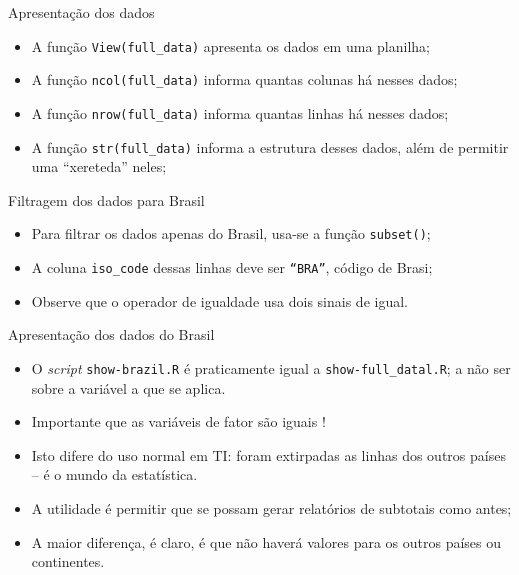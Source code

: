 \documentclass[a4paper,10pt]{beamer}
\begin{document}
\begin{frame}[fragile]{Apresentação dos dados}
  
  
  \begin{itemize}
      \item A função {\tt View(full\_data)} apresenta os dados em uma 
	  planilha;
      \item A função  {\tt ncol(full\_data)} informa quantas colunas há nesses
	  dados;
      \item A função  {\tt nrow(full\_data)} informa quantas linhas há nesses
	  dados;
      \item A função  {\tt str(full\_data)} informa a estrutura desses 
	  dados, além de permitir uma ``xereteda'' neles;
  \end{itemize}

\end{frame}

\begin{frame}{ Filtragem dos dados para Brasil}
  
  
  \begin{itemize}
      \item Para filtrar os dados apenas do Brasil, usa-se a função 
	  {\tt subset()};
      \item A coluna {\tt iso\_code} dessas linhas deve ser {\tt ``BRA''}, 
	  código de Brasi;
      \item Observe que o operador de igualdade usa dois sinais de igual.
  \end{itemize}

\end{frame}

\begin{frame}{ Apresentação dos dados do Brasil}
  
  
  \begin{itemize}
      \item O {\em script} {\tt show-brazil.R} é praticamente igual a 
	  {\tt show-full\_datal.R}; a não ser sobre a variável a que se aplica.
      \item Importante que as variáveis de fator são iguais ! 
      \item Isto difere do uso normal em TI: foram extirpadas as linhas dos
	  outros países -- é o mundo da estatística.
      \item A utilidade é permitir que se possam gerar relatórios de subtotais 
	  como antes;
      \item A maior diferença, é claro, é que não haverá valores para os outros
	  países ou continentes.
  \end{itemize}

\end{frame}
\end{document}
